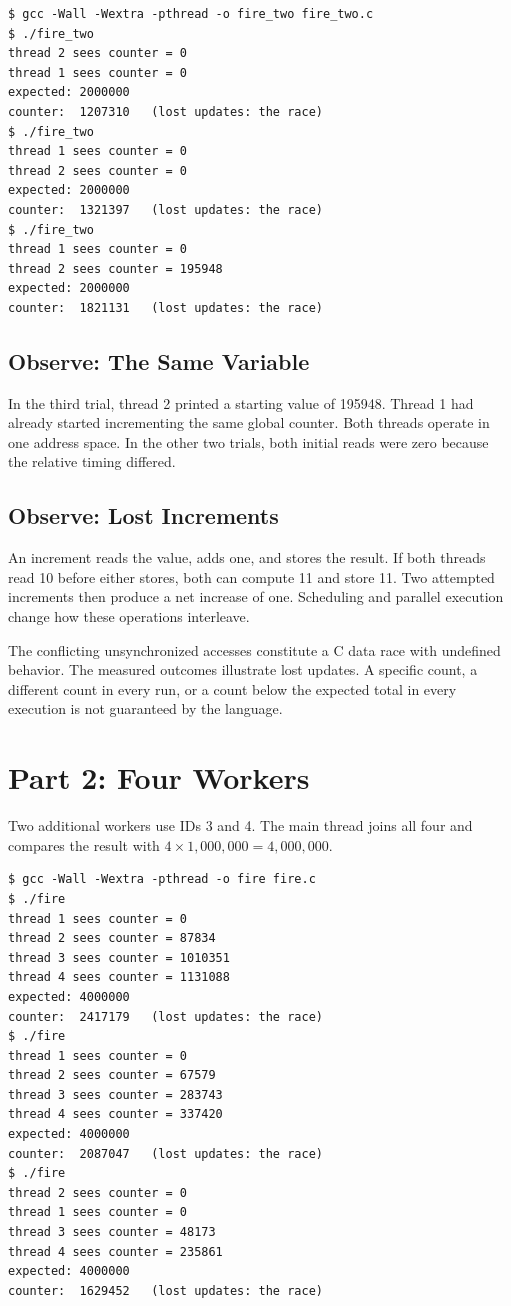 \documentclass[12pt,a4paper]{article}
\begin{document}
\begin{lstlisting}[caption={Three actual trials with two workers}]
$ gcc -Wall -Wextra -pthread -o fire_two fire_two.c
$ ./fire_two
thread 2 sees counter = 0
thread 1 sees counter = 0
expected: 2000000
counter:  1207310   (lost updates: the race)
$ ./fire_two
thread 1 sees counter = 0
thread 2 sees counter = 0
expected: 2000000
counter:  1321397   (lost updates: the race)
$ ./fire_two
thread 1 sees counter = 0
thread 2 sees counter = 195948
expected: 2000000
counter:  1821131   (lost updates: the race)
\end{lstlisting}

\subsection{Observe: The Same Variable}
In the third trial, thread 2 printed a starting value of 195948. Thread 1 had
already started incrementing the same global counter. Both threads operate in
one address space. In the other two trials, both initial reads were zero because
the relative timing differed.

\subsection{Observe: Lost Increments}
An increment reads the value, adds one, and stores the result. If both threads
read 10 before either stores, both can compute 11 and store 11. Two attempted
increments then produce a net increase of one. Scheduling and parallel execution
change how these operations interleave.

The conflicting unsynchronized accesses constitute a C data race with undefined
behavior. The measured outcomes illustrate lost updates. A specific count, a
different count in every run, or a count below the expected total in every
execution is not guaranteed by the language.

\section{Part 2: Four Workers}
Two additional workers use IDs 3 and 4. The main thread joins all four and compares
the result with \(4\times1{,}000{,}000=4{,}000{,}000\).

\begin{lstlisting}[caption={Three actual trials with four workers}]
$ gcc -Wall -Wextra -pthread -o fire fire.c
$ ./fire
thread 1 sees counter = 0
thread 2 sees counter = 87834
thread 3 sees counter = 1010351
thread 4 sees counter = 1131088
expected: 4000000
counter:  2417179   (lost updates: the race)
$ ./fire
thread 1 sees counter = 0
thread 2 sees counter = 67579
thread 3 sees counter = 283743
thread 4 sees counter = 337420
expected: 4000000
counter:  2087047   (lost updates: the race)
$ ./fire
thread 2 sees counter = 0
thread 1 sees counter = 0
thread 3 sees counter = 48173
thread 4 sees counter = 235861
expected: 4000000
counter:  1629452   (lost updates: the race)
\end{lstlisting}
\end{document}
